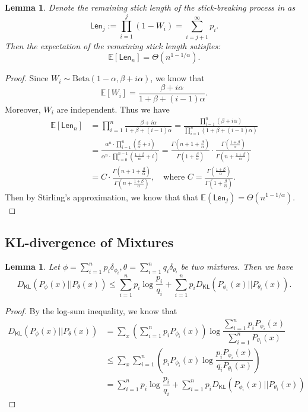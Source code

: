 \documentclass[11pt]{article}
\theoremstyle{plain}
\newtheorem{lemma}[theorem]{Lemma}
\theoremstyle{definition}
\newcommand{\DKL}{D_{\mathsf{KL}}}
\newcommand{\Len}{\mathsf{Len}}
\begin{document}
\begin{lemma}
\label{lem:L_j}
Denote the remaining stick length of the stick-breaking process in  as \[\Len_j:=\prod_{i=1}^j(1-W_i)=\sum\limits_{i=j+1}^{\infty}p_i.\]
Then the expectation of the remaining stick length satisfies:
    \[\mathbb{E}[\Len_n]=\Theta(n^{1-1/\alpha}).\]
\end{lemma}
\begin{proof}
Since $W_i \sim \text{Beta}(1 - \alpha, \beta + i \alpha)$, we know that \[\mathbb{E}[W_i]=\frac{\beta + i\alpha}{1 + \beta + (i-1)\alpha}.\]
Moreover, $W_i$ are independent. Thus we have
\begin{align*}
\mathbb{E}[\Len_n] 
&= \prod_{i=1}^{n} \frac{\beta + i\alpha}{1 + \beta + (i-1)\alpha} 
= \frac{\prod_{i=1}^{n} (\beta + i\alpha)}{\prod_{i=1}^{n} (1 + \beta + (i-1)\alpha)} \\
&= \frac{\alpha^n \cdot \prod_{i=1}^{n} \left( \frac{\beta}{\alpha} + i \right)}{\alpha^n \cdot \prod_{i=0}^{n-1} \left( \frac{1 + \beta}{\alpha} + i \right)} 
= \frac{\Gamma\left(n + 1 + \frac{\beta}{\alpha} \right)}{\Gamma\left(1 + \frac{\beta}{\alpha} \right)} \cdot \frac{\Gamma\left( \frac{1 + \beta}{\alpha} \right)}{\Gamma\left( n + \frac{1 + \beta}{\alpha} \right)} \\
&= C \cdot \frac{\Gamma\left(n + 1 + \frac{\beta}{\alpha} \right)}{\Gamma\left( n + \frac{1 + \beta}{\alpha} \right)}, \quad \text{where } C = \frac{\Gamma\left( \frac{1 + \beta}{\alpha} \right)}{\Gamma\left(1 + \frac{\beta}{\alpha} \right)}.
\end{align*}
Then by Stirling's approximation, we know that that $\mathbb{E}(\Len_j)=\Theta(n^{1-1/\alpha}).$
\end{proof}
\subsection{KL-divergence of Mixtures}
\begin{lemma}
\label{lem:mixture KL}
Let $\phi=\sum\limits_{i=1}^{n}p_i\delta_{\phi_i},\theta=\sum\limits_{i=1}^{n}q_i\delta_{\theta_i}$
be two mixtures. Then we have
\[\DKL(P_{\phi}(x)||P_{\theta}(x))\le \sum\limits_{i=1}^np_i\log \dfrac{p_i}{q_i}+\sum\limits_{i=1}^np_i \DKL(P_{\phi_i}(x)||P_{\theta_i}(x)).\]
\end{lemma}
\begin{proof}
By the log-sum inequality, we know that 
\begin{align*}
    \DKL(P_{\phi}(x)||P_{\theta}(x)) &= \sum\limits_{x} \left(\sum_{i=1}^n p_i P_{\phi_i}(x) \right) \log\dfrac{ \sum_{i=1}^n p_i P_{\phi_i}(x) }{ \sum_{i=1}^nP_{\theta_i}(x)}
    \\& \le \sum\limits_{x} \sum_{i=1}^n \left(p_i P_{\phi_i}(x)  \log\dfrac{ p_iP_{\phi_i}(x) }{ q_iP_{\theta_i}(x)}\right)
    \\&= \sum\limits_{i=1}^n p_i\log\dfrac{p_i}{q_i}+\sum\limits_{i=1}^np_i \DKL(P_{\phi_i}(x)||P_{\theta_i}(x))
\end{align*}
\end{proof}
\end{document}
